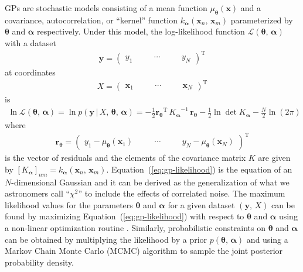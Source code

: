 \documentclass[manuscript, letterpaper]{aastex6}
\makeatletter
\let\origsection\section
\renewcommand\section{\@ifstar{\starsection}{\nostarsection}}
\newcommand\nostarsection[1]{\sectionprelude\origsection{#1}}
\newcommand\starsection[1]{\sectionprelude\origsection*{#1}}
\newcommand\sectionprelude{\vspace{1em}}
\renewcommand{\eqref}[1]{\ref{eq:#1}}
\newcommand{\Eq}[1]{Equation~(\eqref{#1})}
\newcommand{\eq}[1]{\Eq{#1}}
\newcommand{\eqlabel}[1]{\label{eq:#1}}
\newcommand{\sectlabel}[1]{\label{sect:#1}}
\newcommand{\T}{\ensuremath{\mathrm{T}}}
\newcommand{\bvec}[1]{{\ensuremath{\boldsymbol{#1}}}}
\newcommand{\response}[1]{{\color{blue}#1}}
\makeatother
\begin{document}
\section{Gaussian processes}\sectlabel{gps}

GPs are stochastic models consisting of a mean function
$\mu_\bvec{\theta}(\bvec{x})$ and a covariance, autocorrelation, or ``kernel''
function $k_\bvec{\alpha}(\bvec{x}_n,\,\bvec{x}_m)$ parameterized by
$\bvec{\theta}$ and $\bvec{\alpha}$ respectively.
Under this model, \response{the log-likelihood function $\mathcal{L}
(\bvec{\theta},\,\bvec{\alpha})$} with a dataset
\begin{eqnarray}
\bvec{y} = \left(\begin{array}{ccccc}
    y_1\quad && \cdots\quad && y_N
\end{array}\right)^\T
\end{eqnarray}
at coordinates
\begin{eqnarray}
X = \left(\begin{array}{ccccc}
    \bvec{x}_1\quad && \cdots\quad && \bvec{x}_N
\end{array}\right)^\T
\end{eqnarray}
is
\begin{eqnarray}\eqlabel{gp-likelihood}
\ln \mathcal{L} (\bvec{\theta},\,\bvec{\alpha}) =
\ln{p(\bvec{y}\,|\,{X,\,\bvec{\theta}},\,\bvec{\alpha})} =
    -\frac{1}{2} {\bvec{r}_\bvec{\theta}}^\T\,{K_\bvec{\alpha}}^{-1}\,
        \bvec{r}_\bvec{\theta}
    -\frac{1}{2}\ln\det K_\bvec{\alpha}
    - \frac{N}{2} \ln{(2\pi)}
\end{eqnarray}
where
\begin{eqnarray}
    \bvec{r}_\bvec{\theta} = \left(\begin{array}{ccccc}
    y_1 - \mu_\bvec{\theta}(\bvec{x}_1)\quad && \cdots\quad &&
    y_N - \mu_\bvec{\theta}(\bvec{x}_N)
\end{array}\right)^\T
\end{eqnarray}
is the vector of residuals and the elements of the covariance matrix $K$ are
given by $[K_\bvec{\alpha}]_{nm} = k_\bvec{\alpha}(\bvec{x}_n,\,\bvec{x}_m)$.
\eq{gp-likelihood} is the equation of an $N$-dimensional Gaussian and it can
be derived as the generalization of what we astronomers call ``$\chi^2$''
to include the effects of correlated noise.
The maximum likelihood values for the parameters $\bvec{\theta}$ and
$\bvec{\alpha}$ for a given dataset $(\bvec{y},\,X)$ can be found by
maximizing \eq{gp-likelihood} with respect to $\bvec{\theta}$ and
$\bvec{\alpha}$ using a non-linear optimization routine \citep{Nocedal:2006}.
Similarly, probabilistic constraints on $\bvec{\theta}$ and $\bvec{\alpha}$
can be obtained by multiplying the likelihood by a prior
$p(\bvec{\theta},\,\bvec{\alpha})$ and using a Markov Chain Monte Carlo (MCMC)
algorithm to sample the joint posterior probability density.
\end{document}
